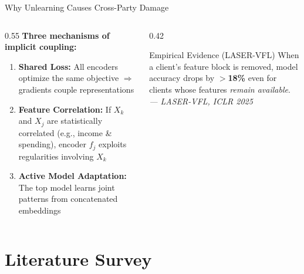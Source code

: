 \documentclass[aspectratio=169, 11pt]{beamer}
\begin{document}
\begin{frame}{Why Unlearning Causes Cross-Party Damage}
  \begin{columns}[T]
    \begin{column}{0.55\textwidth}
      \textbf{Three mechanisms of implicit coupling:}
      \begin{enumerate}
        \item \textbf{Shared Loss:} All encoders optimize the same objective $\Rightarrow$ gradients couple representations
        \item \textbf{Feature Correlation:} If $X_k$ and $X_j$ are statistically correlated (e.g., income \& spending), encoder $f_j$ exploits regularities involving $X_k$
        \item \textbf{Active Model Adaptation:} The top model learns joint patterns from concatenated embeddings
      \end{enumerate}
    \end{column}
    \begin{column}{0.42\textwidth}
      \begin{exampleblock}{Empirical Evidence (LASER-VFL)}
        When a client's feature block is removed, model accuracy drops by \textbf{$>$18\%} even for clients whose features \emph{remain available}.
        \vspace{0.15cm}\\
        {\footnotesize \textit{— LASER-VFL, ICLR 2025}}
      \end{exampleblock}
    \end{column}
  \end{columns}
\end{frame}

\section{Literature Survey}
\end{document}
